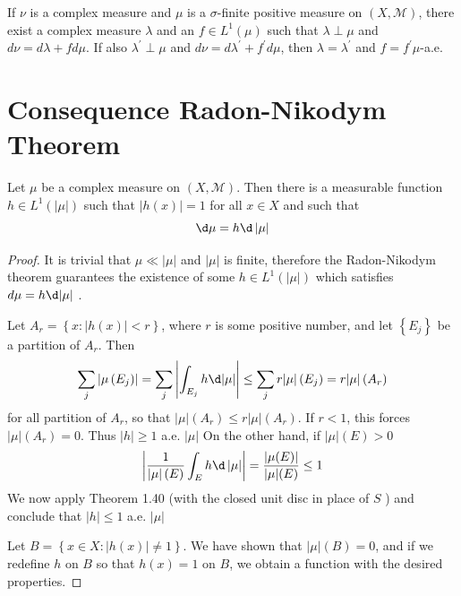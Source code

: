 \documentclass[12pt, a4paper, oneside]{book}
\begin{document}
\begin{theorem}
    If $\nu$ is a complex measure and $\mu$ is a $\sigma$-finite positive measure on $(X, \mathcal{M})$, there exist a complex measure $\lambda$ and an $f \in L^1(\mu)$ such that $\lambda \perp \mu$ and $d \nu=d \lambda+f d \mu$. If also $\lambda^{\prime} \perp \mu$ and $d \nu=d \lambda^{\prime}+f^{\prime} d \mu$, then $\lambda=\lambda^{\prime}$ and $f=f^{\prime} \mu$-a.e.
\end{theorem}


\section{Consequence Radon-Nikodym Theorem}

\begin{theorem}
    Let $\mu$ be a complex measure on $\left(X,\mathcal{M}\right)$. Then there is a measurable function $h\in L^1 (\left|\mu\right|)$ such that $\left|h(x)\right|=1$ for all $x \in X$ and such that
    \begin{equation*}
        \d \mu
        =
        h \d \left|\mu\right|
    \end{equation*}
    \begin{proof}
        It is trivial that $\mu \ll|\mu|$ and $\left|\mu\right|$ is finite, therefore the Radon-Nikodym theorem guarantees the existence of some $h \in L^1(|\mu|)$ which satisfies $d \mu=h \d |\mu|$ .

        Let $A_r=\left\{x:|h(x)|<r\right\}$, where $r$ is some positive number, and let $\left\{E_j\right\}$ be a partition of $A_r$.
        Then
        \begin{equation*}
            \sum_j \left|\mu\left(E_j\right)\right|
            =\sum_j \left|\int_{E_j} h \d | \mu| \right|
            \leq \sum_j r|\mu|\left(E_j\right)=r|\mu|\left(A_r\right)
        \end{equation*}
        for all partition of $A_r$, so that $|\mu|\left(A_r\right) \leq r|\mu|\left(A_r\right)$. If $r<1$, this forces $|\mu|\left(A_r\right)=0$. Thus $|h| \geq 1$ a.e. $\left|\mu\right|$
        On the other hand, if $|\mu|(E)>0$
        \begin{equation*}
            \left| \frac{1}{\left|\mu\right| (E)}  \int_E h \d  \left| \mu\right| \right| =\frac{|\mu(E)|}{|\mu|(E)} \leq 1
        \end{equation*}
        We now apply Theorem 1.40 (with the closed unit disc in place of $S$ ) and conclude that $|h| \leq 1$ a.e. $\left|\mu\right|$

        Let $B=\left\{x \in X:|h(x)| \neq 1\right\}$. We have shown that $|\mu|(B)=0$, and if we redefine $h$ on $B$ so that $h(x)=1$ on $B$, we obtain a function with the desired properties.
    \end{proof}
\end{theorem}
\end{document}
